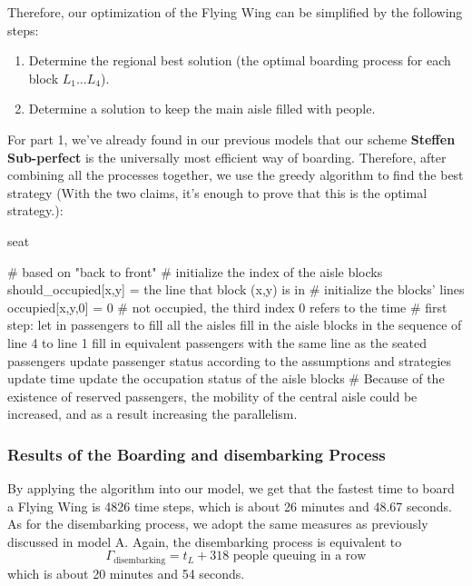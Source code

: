 \documentclass{article}
\theoremstyle{definition}
\theoremstyle{remark}
\numberwithin{equation}{section}
\begin{document}
	Therefore, our optimization of the Flying Wing can be simplified by the following steps:
	\begin{enumerate}
		\item Determine the regional best solution (the optimal boarding process for each block \(L_1 \ldots L_4\)).
		\item Determine a solution to keep the main aisle filled with people.
	\end{enumerate}
	For part 1, we've already found in our previous models that our scheme \textbf{Steffen Sub-perfect} is the universally most efficient way of boarding. Therefore, after combining all the processes together, we use the greedy algorithm to find the best strategy (With the two claims, it's enough to prove that this is the optimal strategy.):
	\begin{algorithm}
		\caption{seat}
		\begin{algorithmic}
			\STATE \# based on "back to front"
			\STATE \# initialize the index of the aisle blocks
			\STATE should\_occupied[x,y] = the line that block (x,y) is in \# initialize the blocks' lines
			\STATE occupied[x,y,0] = 0 \# not occupied, the third index 0 refers to the time
			\STATE \# first step: let in passengers to fill all the aisles
			\ENDFOR
			\STATE fill in the aisle blocks in the sequence of line 4 to line 1
			\ENDWHILE
			\STATE fill in equivalent passengers with the same line as the seated passengers
			\ENDIF
			\STATE update passenger status according to the assumptions and strategies
			\STATE update time
			\STATE update the occupation status of the aisle blocks
			\STATE \# Because of the existence of reserved passengers, the mobility of the central aisle could be increased, and as a result increasing the parallelism.
			\ENDWHILE
		\end{algorithmic}
	\end{algorithm}
	\subsubsection{Results of the Boarding and disembarking Process}
	By applying the algorithm into our model, we get that the fastest time to board a Flying Wing is 4826 time steps, which is about 26 minutes and 48.67 seconds. As for the disembarking process, we adopt the same measures as previously discussed in model A. Again, the disembarking process is equivalent to
	\[\Gamma_{\text{disembarking}}=t_L+\text{318 people queuing in a row}\]
	which is about 20 minutes and 54 seconds.
\end{document}
